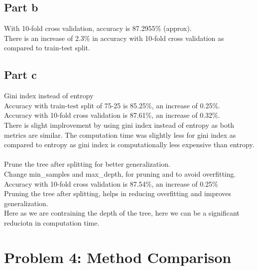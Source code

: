 \documentclass[12pt]{article}
\begin{document}
\subsection*{Part b}
With 10-fold cross validation, accuracy is 87.2955\% (approx). \\
There is an increase of 2.3\% in accuracy with 10-fold cross validation as compared to train-test split. \\ 

\subsection*{Part c}
Gini index instead of entropy \\
Accuracy with train-test split of 75-25 is 85.25\%, an increase of 0.25\%. \\
Accuracy with 10-fold cross validation is 87.61\%, an increase of 0.32\%. \\
There is slight implrovement by using gini index instead of entropy as both metrics are similar. The computation time was slightly 
less for gini index as compared to entropy as gini index is computationally less expensive than entropy. \\
\\
Prune the tree after splitting for better generalization. \\
Change min\_samples and max\_depth, for pruning and to avoid overfitting. \\
Accuracy with 10-fold cross validation is 87.54\%, an increase of 0.25\% \\
Pruning the tree after splitting, helps in reducing overfitting and improves generalization. \\
Here as we are contraining the depth of the tree, here we can be a significant reduciotn in computation time. \\

\section*{Problem 4: Method Comparison}
\end{document}
